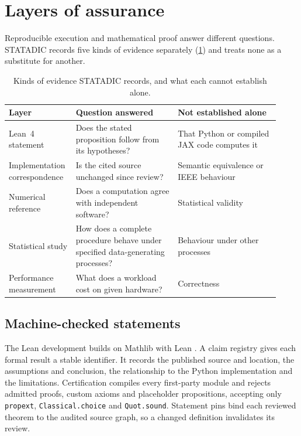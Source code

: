 \section{Layers of assurance}\label{sec:assurance}

Reproducible execution and mathematical proof answer different
questions. STATADIC records five kinds of evidence separately
(\cref{tab:layers}) and treats none as a substitute for another.

\begin{table}[t]
  \centering
  \small
  \caption{Kinds of evidence STATADIC records, and what each cannot establish
  alone.}
  \label{tab:layers}
  \begin{tabular}{@{}>{\raggedright\arraybackslash}p{0.2\linewidth}
      >{\raggedright\arraybackslash}p{0.36\linewidth}
    >{\raggedright\arraybackslash}p{0.36\linewidth}@{}}
    \toprule
    Layer & Question answered & Not established alone \\
    \midrule
    Lean~4 statement & Does the stated proposition follow from its hypotheses? &
    That Python or compiled JAX code computes it \\
    Implementation correspondence & Is the cited source unchanged since
    review? & Semantic equivalence or IEEE behaviour \\
    Numerical reference & Does a computation agree with independent software? &
    Statistical validity \\
    Statistical study & How does a complete procedure behave under specified
    data-generating processes? & Behaviour under other processes \\
    Performance measurement & What does a workload cost on given hardware? &
    Correctness \\
    \bottomrule
  \end{tabular}
\end{table}

\subsection{Machine-checked statements}

The Lean development builds on Mathlib with Lean . A
claim registry gives each formal result a stable identifier. It records the
published source and location, the assumptions and conclusion, the relationship
to the Python implementation and the limitations. Certification compiles every
first-party module and rejects admitted proofs, custom axioms and placeholder
propositions, accepting only \texttt{propext}, \texttt{Classical.choice} and
\texttt{Quot.sound}. Statement pins bind each reviewed theorem to the audited
source graph, so a changed definition invalidates its review.

